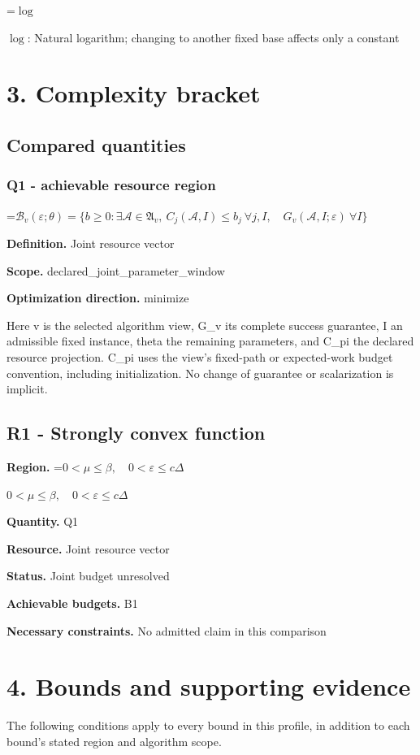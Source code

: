 \documentclass[10pt,a4paper]{article}
\newcommand{\AtlasMath}[1]{\par\begingroup\centering\setbox0=\hbox{$\displaystyle #1$}\ifdim\wd0>1.4\linewidth\typeout{ATLAS WIDE FORMULA: \the\wd0}\fi\ifdim\wd0>\linewidth\resizebox{\linewidth}{!}{\box0}\else\box0\fi\par\endgroup}
\newcommand{\AtlasInlineMath}[1]{\begingroup\setbox0=\hbox{$#1$}\ifdim\wd0>.4\linewidth\endgroup\AtlasMath{#1}\else\endgroup$#1$\fi}
\begin{document}
\AtlasInlineMath{\log}: Natural logarithm; changing to another fixed base affects only a constant

\section{3. Complexity bracket}
\subsection{Compared quantities}
\subsubsection{Q1 - achievable resource region}
\AtlasMath{\mathcal B_v(\varepsilon;\theta)=\{b\ge0:\exists\mathcal A\in\mathfrak A_v,\ C_j(\mathcal A,I)\le b_j\ \forall j,I,\quad G_v(\mathcal A,I;\varepsilon)\ \forall I\}}
\textbf{Definition.} Joint resource vector

\textbf{Scope.} declared\_joint\_parameter\_window

\textbf{Optimization direction.} minimize

Here v is the selected algorithm view, G\_v its complete success guarantee, I an admissible fixed instance, theta the remaining parameters, and C\_pi the declared resource projection. C\_pi uses the view's fixed-path or expected-work budget convention, including initialization. No change of guarantee or scalarization is implicit.

\subsection{R1 - Strongly convex function}
\textbf{Region.} \AtlasInlineMath{0<\mu\le\beta,\quad0<\varepsilon\le c\Delta}

\textbf{Quantity.} Q1

\textbf{Resource.} Joint resource vector

\textbf{Status.} Joint budget unresolved

\textbf{Achievable budgets.} B1

\textbf{Necessary constraints.} No admitted claim in this comparison

\section{4. Bounds and supporting evidence}
The following conditions apply to every bound in this profile, in addition to each bound's stated region and algorithm scope.
\end{document}
